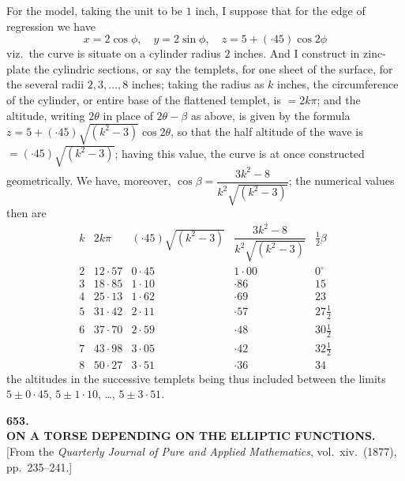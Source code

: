 \documentclass[11pt,a4paper]{article}
\begin{document}
For the model, taking the unit to be $1$ inch, I suppose that for the edge of regression we have
\[
x = 2\cos\phi,\quad y = 2\sin\phi,\quad z = 5 + (\cdot 45)\cos 2\phi
\]
viz.\ the curve is situate on a cylinder radius $2$ inches. And I construct in zinc-plate the cylindric sections, or say the templets, for one sheet of the surface, for the several radii $2, 3, \ldots, 8$ inches; taking the radius as $k$ inches, the circumference of the cylinder, or entire base of the flattened templet, is $= 2k\pi$; and the altitude, writing $2\theta$ in place of $2\theta - \beta$ as above, is given by the formula $z = 5 + (\cdot 45)\sqrt{(k^2 - 3)}\cos 2\theta$, so that the half altitude of the wave is $= (\cdot 45)\sqrt{(k^2 - 3)}$; having this value, the curve is at once constructed geometrically. We have, moreover, $\cos\beta = \dfrac{3k^2 - 8}{k^2 \sqrt{(k^2 - 3)}}$; the numerical values then are
\[
\begin{array}{ccccc}
k & 2k\pi & (\cdot 45)\sqrt{(k^2 - 3)} & \dfrac{3k^2 - 8}{k^2 \sqrt{(k^2 - 3)}} & \tfrac{1}{2}\beta \\[6pt]
2 & 12 \cdot 57 & 0 \cdot 45 & 1 \cdot 00 & 0^\circ \\
3 & 18 \cdot 85 & 1 \cdot 10 & \cdot 86 & 15 \\
4 & 25 \cdot 13 & 1 \cdot 62 & \cdot 69 & 23 \\
5 & 31 \cdot 42 & 2 \cdot 11 & \cdot 57 & 27\tfrac{1}{2} \\
6 & 37 \cdot 70 & 2 \cdot 59 & \cdot 48 & 30\tfrac{1}{2} \\
7 & 43 \cdot 98 & 3 \cdot 05 & \cdot 42 & 32\tfrac{1}{2} \\
8 & 50 \cdot 27 & 3 \cdot 51 & \cdot 36 & 34
\end{array}
\]
the altitudes in the successive templets being thus included between the limits $5 \pm 0 \cdot 45$, $5 \pm 1 \cdot 10$, \ldots, $5 \pm 3 \cdot 51$.

\newpage


\begin{center}
{\Large\bfseries 653.}\\[1em]
{\large\bfseries ON A TORSE DEPENDING ON THE ELLIPTIC FUNCTIONS.}\\[0.5em]
[From the \textit{Quarterly Journal of Pure and Applied Mathematics}, vol.~xiv.\ (1877), pp.~235--241.]
\end{center}
\end{document}
